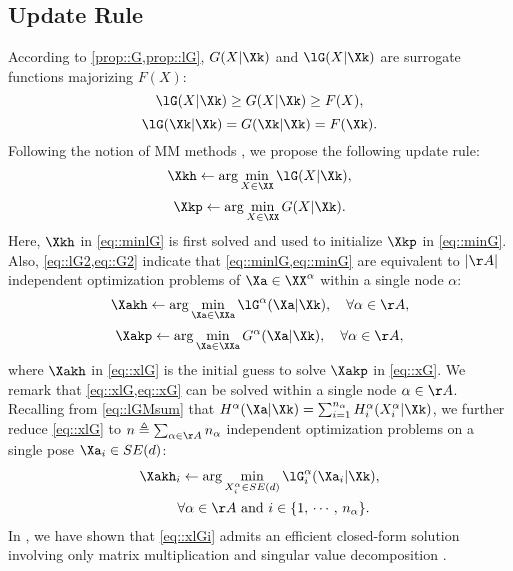 \subsection{Update Rule}\label{section::mm::update}
According to \cref{prop::G,prop::lG}, $G(X|\Xk)$ and $\lG(X|\Xk)$ are surrogate functions majorizing $F(X)$:
\begin{equation}\label{eq::lGGFeq}
	\lG(X|\Xk) \geq G(X|\Xk) \geq F(X),
\end{equation}
\begin{equation}\label{eq::lGGFneq}
\lG(\Xk|\Xk) = G(\Xk|\Xk) = F(\Xk).
\end{equation}
Following the notion of MM methods \cite{hunter2004tutorial}, we propose the following update rule:
\begin{equation}\label{eq::minlG}
	\Xkh\gets\arg\min_{X\in \XX} \lG(X|\Xk),
\end{equation}
\begin{equation}\label{eq::minG}
	\Xkp\gets\arg\min_{X\in \XX} G(X|\Xk).
\end{equation}
Here, $\Xkh$  in \cref{eq::minlG} is first solved and used to initialize $\Xkp$ in \cref{eq::minG}. Also, \cref{eq::lG2,eq::G2} indicate that \cref{eq::minlG,eq::minG} are equivalent to  $|\AA|$ independent optimization problems of $\Xa\in\XX^\alpha$ within a single node $\alpha$:
\begin{equation}\label{eq::xlG}
	\Xakh\gets\arg\min_{\Xa\in \XXa}\lG^\alpha(\Xa|\Xk),\quad \forall\alpha\in\AA,
\end{equation}
\begin{equation}\label{eq::xG}
	\Xakp\gets\arg\min_{\Xa\in \XXa}G^\alpha(\Xa|\Xk),\quad \forall\alpha\in\AA,
\end{equation}
where  $\Xakh$ in \cref{eq::xlG} is the initial guess to solve $\Xakp$ in \cref{eq::xG}. We remark that \cref{eq::xlG,eq::xG} can be  solved within a single node $\alpha\in\AA$. Recalling from \cref{eq::lGMsum} that $H^\alpha(\Xa|\Xk)=\sum_{i=1}^{n_\alpha}H_i^{\alpha}(X_i^{\alpha}|\Xk)$, we further reduce \cref{eq::xlG} to $n\triangleq\sum_{\alpha\in\AA} n_\alpha$ independent optimization problems on a single pose $\Xa_i\in SE(d)$:
\vspace{-0.5em}
\begin{multline}\label{eq::xlGi}
	\Xakh_i\gets\arg\min_{X_i^\alpha\in SE(d)}\lG_i^\alpha(\Xa_i|\Xk),\\
	\quad\quad\forall\alpha\in\AA\text{ and } i\in \{1,\,\cdots,\,n_\alpha\}.
\end{multline}
In , we have shown that \cref{eq::xlGi} admits an efficient closed-form solution involving only matrix multiplication and singular value decomposition \cite{umeyama1991least}.

